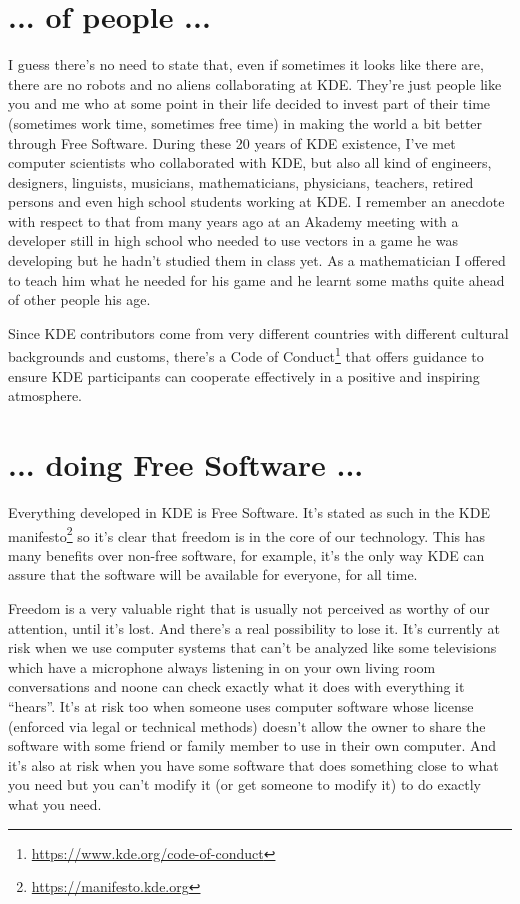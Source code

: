 \section*{... of people ...}
I guess there's no need to state that, even if sometimes it looks like there are, there are no robots and no aliens collaborating at KDE. They're just people like you and me who at some point in their life decided to invest part of their time (sometimes work time, sometimes free time) in making the world a bit better through Free Software. During these 20 years of KDE existence, I've met computer scientists who collaborated with KDE, but also all kind of engineers, designers, linguists, musicians, mathematicians, physicians, teachers, retired persons and even high school students working at KDE. I remember an anecdote with respect to that from many years ago at an Akademy meeting with a developer still in high school who needed to use vectors in a game he was developing but he hadn't studied them in class yet. As a mathematician I offered to teach him what he needed for his game and he learnt some maths quite ahead of other people his age.

Since KDE contributors come from very different countries with different cultural backgrounds and customs, there's a Code of Conduct\footnote{\url{https://www.kde.org/code-of-conduct}} that offers guidance to ensure KDE participants can cooperate effectively in a positive and inspiring atmosphere.

\section*{... doing Free Software ...}
Everything developed in KDE is Free Software. It's stated as such in the KDE manifesto\footnote{\url{https://manifesto.kde.org}} so it's clear that freedom is in the core of our technology. This has many benefits over non-free software, for example, it's the only way KDE can assure that the software will be available for everyone, for all time.

Freedom is a very valuable right that is usually not perceived as worthy of our attention, until it's lost. And there's a real possibility to lose it. It's currently at risk when we use computer systems that can't be analyzed like some televisions which have a microphone always listening in on your own living room conversations and noone can check exactly what it does with everything it “hears”. It's at risk too when someone uses computer software whose license (enforced via legal or technical methods) doesn't allow the owner to share the software with some friend or family member to use in their own computer. And it's also at risk when you have some software that does something close to what you need but you can't modify it (or get someone to modify it) to do exactly what you need.

